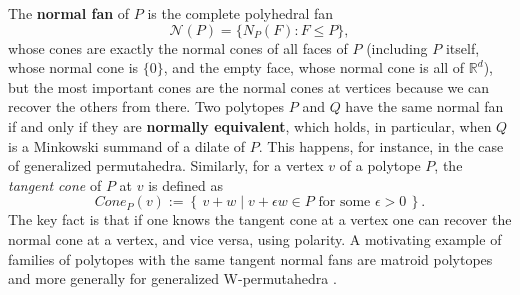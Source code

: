 \documentclass{amsart}
\theoremstyle{definition}
\begin{document}
The \textbf{normal fan} of $P$ is the complete polyhedral fan
\[
\mathcal{N}(P) = \{ N_P(F) : F \leq P \},
\]
whose cones are exactly the normal cones of all faces of $P$ (including $P$ itself, whose normal cone is $\{0\}$, and the empty face, whose normal cone is all of $\mathbb{R}^d$), but the most important cones are the normal cones at vertices because we can recover the others from there. Two polytopes $P$ and $Q$ have the same normal fan if and only if they are \textbf{normally equivalent}, which holds, in particular, when $Q$ is a Minkowski summand of a dilate of $P$. This happens, for instance, in the case of generalized permutahedra. Similarly, for a vertex $v$ of a polytope $P$, the \emph{tangent cone} of $P$ at $v$ is defined as 
\begin{equation*}
    Cone_P(v) := \left\{\, v + w \; | \;  v + \epsilon  w \in P \text{ for some } \epsilon > 0 \, \right\}.
\end{equation*}
The key fact is that if one knows the tangent cone at a vertex one can recover the normal cone at a vertex, and vice versa, using polarity. A motivating example of families of polytopes with the same tangent  normal fans are matroid polytopes \cite{DeLoeraHawsKoeppe} and more generally for generalized W-permutahedra \cite{BjornerBrenti05,Pons2023,CeballosPons2024}. 
\end{document}
